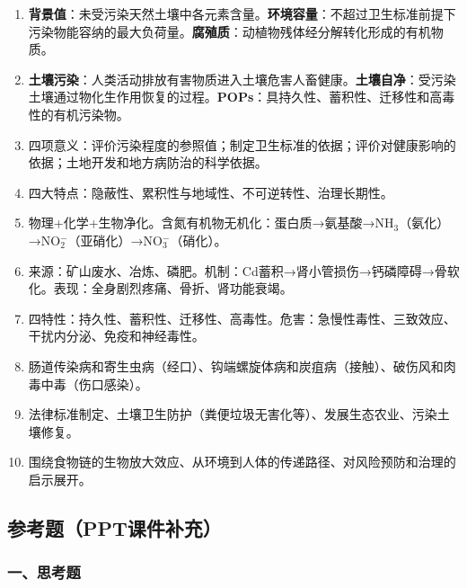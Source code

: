 \documentclass[10pt,a4paper,oneside]{ctexbook}
\begin{document}
\begin{enumerate}[leftmargin=*, itemsep=5pt]
    \item \textbf{背景值}：未受污染天然土壤中各元素含量。\textbf{环境容量}：不超过卫生标准前提下污染物能容纳的最大负荷量。\textbf{腐殖质}：动植物残体经分解转化形成的有机物质。

    \item \textbf{土壤污染}：人类活动排放有害物质进入土壤危害人畜健康。\textbf{土壤自净}：受污染土壤通过物化生作用恢复的过程。\textbf{POPs}：具持久性、蓄积性、迁移性和高毒性的有机污染物。

    \item 四项意义：评价污染程度的参照值；制定卫生标准的依据；评价对健康影响的依据；土地开发和地方病防治的科学依据。

    \item 四大特点：隐蔽性、累积性与地域性、不可逆转性、治理长期性。

    \item 物理+化学+生物净化。含氮有机物无机化：蛋白质→氨基酸→NH$_3$（氨化）→NO$_2^-$（亚硝化）→NO$_3^-$（硝化）。

    \item 来源：矿山废水、冶炼、磷肥。机制：Cd蓄积→肾小管损伤→钙磷障碍→骨软化。表现：全身剧烈疼痛、骨折、肾功能衰竭。

    \item 四特性：持久性、蓄积性、迁移性、高毒性。危害：急慢性毒性、三致效应、干扰内分泌、免疫和神经毒性。

    \item 肠道传染病和寄生虫病（经口）、钩端螺旋体病和炭疽病（接触）、破伤风和肉毒中毒（伤口感染）。

    \item 法律标准制定、土壤卫生防护（粪便垃圾无害化等）、发展生态农业、污染土壤修复。

    \item 围绕食物链的生物放大效应、从环境到人体的传递路径、对风险预防和治理的启示展开。
\end{enumerate}

\subsection*{参考题（PPT课件补充）}

\subsubsection*{一、思考题}
\end{document}
